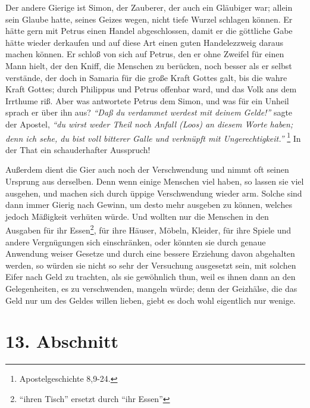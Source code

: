 Der andere Gierige ist Simon, der Zauberer, der auch ein Gläubiger war; allein
sein Glaube hatte, seines Geizes wegen, nicht tiefe Wurzel schlagen können. Er
hätte gern mit Petrus einen Handel abgeschlossen, damit er die göttliche Gabe
hätte wieder derkaufen und auf diese Art einen guten Handelezzweig daraus machen
können. Er schloß von sich auf Petrus, den er ohne Zweifel für einen Mann hielt,
der den Kniff, die Menschen zu berücken, noch besser als er selbst verstände,
der doch in Samaria für die große Kraft Gottes galt, bis die wahre Kraft Gottes;
durch Philippus und Petrus offenbar ward, und das Volk ans dem Irrthume riß.
Aber was antwortete Petrus dem Simon, und was für ein Unheil sprach er über ihn
aus? \textit{"`Daß du verdammet werdest mit deinem Gelde!"'} sagte der Apostel, \textit{"`du wirst
weder Theil noch Anfall (Loos) an diesem Worte haben; denn ich sehe, du bist
voll bitterer Galle und verknüpft mit Ungerechtigkeit."'}
\footnote{Apostelgeschichte 8,9-24.}
In der That ein schauderhafter Ausspruch!

\medskip

Außerdem dient die Gier auch noch der Verschwendung und nimmt oft seinen
Ursprung aus derselben. Denn wenn einige Menschen viel haben, so lassen sie viel
ausgehen, und machen sich durch üppige Verschwendung wieder arm. Solche sind
dann immer Gierig nach Gewinn, um desto mehr ausgeben zu können, welches jedoch
Mäßigkeit verhüten würde. Und wollten nur die Menschen in den Ausgaben für ihr Essen\footnote{"`ihren Tisch"' ersetzt durch "`ihr Essen"'}, für ihre Häuser, Möbeln, Kleider, für ihre Spiele und andere Vergnügungen
sich einschränken, oder könnten sie durch genaue Anwendung weiser Gesetze und
durch eine bessere Erziehung davon abgehalten werden, so würden sie nicht so
sehr der Versuchung ausgesetzt sein, mit solchen Eifer nach Geld zu trachten,
als sie gewöhnlich thun, weil es ihnen dann an den Gelegenheiten, es zu
verschwenden, mangeln würde; denn der Geizhälse, die das Geld nur um des Geldes
willen lieben, giebt es doch wohl eigentlich nur wenige.

\section{13. Abschnitt} \label{kap13_ab13} 


